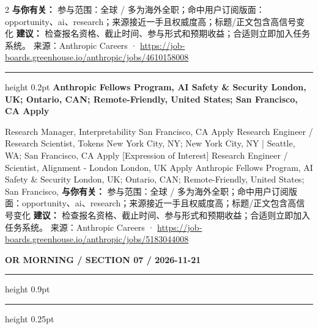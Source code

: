 \documentclass[10.5pt]{ctexart}
\begin{document}
\begin{multicols}{2}
\textbf{与你有关：} 参与范围：全球 / 多为海外全职；命中用户订阅版面：opportunity、ai、research；来源接近一手且权威度高；标题/正文包含高信号变化
\textbf{建议：} 检查报名资格、截止时间、参与形式和预期收益；合适则立即加入任务系统。
{\footnotesize\color{ormuted} 来源：Anthropic Careers · \url{https://job-boards.greenhouse.io/anthropic/jobs/4610158008}}
\vspace{2mm}
\hrule height 0.2pt
\vspace{2mm}
{\large\bfseries Anthropic Fellows Program, AI Safety \& Security London, UK; Ontario, CAN; Remote-Friendly, United States; San Francisco, CA Apply}\par
[Expression of Interest] Research Manager, Interpretability San Francisco, CA Apply Research Engineer / Research Scientist, Tokens New York City, NY; New York City, NY | Seattle, WA; San Francisco, CA Apply [Expression of Interest] Research Engineer / Scientist, Alignment - London London, UK Apply Anthropic Fellows Program, AI Safety \& Security London, UK; Ontario, CAN; Remote-Friendly, United States; San Francisco, 
\textbf{与你有关：} 参与范围：全球 / 多为海外全职；命中用户订阅版面：opportunity、ai、research；来源接近一手且权威度高；标题/正文包含高信号变化
\textbf{建议：} 检查报名资格、截止时间、参与形式和预期收益；合适则立即加入任务系统。
{\footnotesize\color{ormuted} 来源：Anthropic Careers · \url{https://job-boards.greenhouse.io/anthropic/jobs/5183044008}}
\end{multicols}
\newpage
{\small\bfseries OR MORNING / SECTION 07 / 2026-11-21}
\vspace{2mm}
\hrule height 0.9pt
\vspace{1.5mm}
\hrule height 0.25pt
\vspace{4mm}
\end{document}
